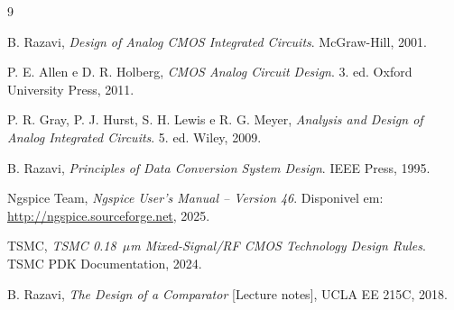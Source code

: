 \documentclass[12pt, a4paper]{article}
\begin{document}
\begin{thebibliography}{9}

B. Razavi,
\textit{Design of Analog CMOS Integrated Circuits}.
McGraw-Hill, 2001.

P. E. Allen e D. R. Holberg,
\textit{CMOS Analog Circuit Design}.
3. ed. Oxford University Press, 2011.

P. R. Gray, P. J. Hurst, S. H. Lewis e R. G. Meyer,
\textit{Analysis and Design of Analog Integrated Circuits}.
5. ed. Wiley, 2009.

B. Razavi,
\textit{Principles of Data Conversion System Design}.
IEEE Press, 1995.

Ngspice Team,
\textit{Ngspice User's Manual -- Version 46}.
Disponivel em: \url{http://ngspice.sourceforge.net}, 2025.

TSMC,
\textit{TSMC 0.18~$\mu$m Mixed-Signal/RF CMOS Technology Design Rules}.
TSMC PDK Documentation, 2024.

B. Razavi,
\textit{The Design of a Comparator} [Lecture notes],
UCLA EE 215C, 2018.

\end{thebibliography}
\end{document}
